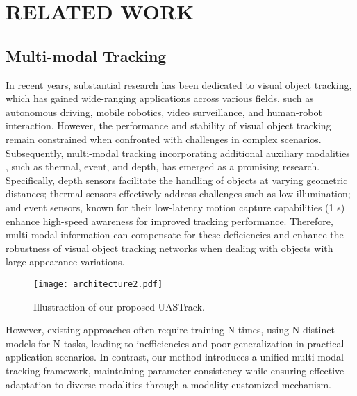 \section{RELATED WORK}
\subsection{Multi-modal Tracking}
In recent years, substantial research \cite{ostrack, STARK, ATOM} has been dedicated to visual object tracking, which has gained wide-ranging applications across various fields, such as autonomous driving, mobile robotics, video surveillance, and human-robot interaction. 
However, the performance and stability of visual object tracking remain constrained when confronted with challenges in complex scenarios.
Subsequently, multi-modal tracking \cite{MFGNet,cbpnet} incorporating additional auxiliary modalities \cite{apfnet,Lu_Li_Yan_Tang_Luo_2021,FANet,TFNet,MaCNet,cmpp, zhang2021object, zhu2024pr}, such as thermal, event, and depth, has emerged as a promising research.
Specifically, depth sensors \cite{rgbd1k} facilitate the handling of objects at varying geometric distances; thermal sensors \cite{GMMT} effectively address challenges such as low illumination; and event sensors, known for their low-latency motion capture capabilities (1 \textmu s) \cite{visevent} enhance high-speed awareness for improved tracking performance.
Therefore, multi-modal information can compensate for these deficiencies and enhance the robustness of visual object tracking networks when dealing with objects with large appearance variations.

\begin{figure*}[t]
\centering
\texttt{[image: architecture2.pdf]}
\caption{Illustraction of our proposed UASTrack.}
\vspace{-3mm}
\label{fig:2}
\end{figure*}


However, existing approaches \cite{tenet,GMMT,zhu2024unimod1k,onetracker} often require training N times, using N distinct models for N tasks, leading to inefficiencies and poor generalization in practical application scenarios.
In contrast, our method introduces a unified multi-modal tracking framework, maintaining parameter consistency while ensuring effective adaptation to diverse modalities through a modality-customized mechanism.


